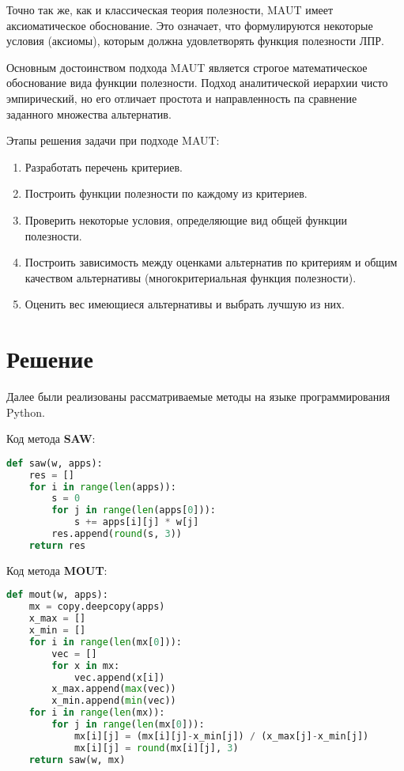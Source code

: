 Точно так же, как и классическая теория полезности, MAUT имеет
аксиоматическое обоснование. Это означает, что формулируются
некоторые условия (аксиомы), которым должна удовлетворять функция
полезности ЛПР.\par
Основным достоинством подхода MAUT является строгое математическое
обоснование вида функции полезности. Подход аналитической иерархии чисто
эмпирический, но его отличает простота и направленность па сравнение
заданного множества альтернатив.

Этапы решения задачи при подходе MAUT:
\begin{enumerate}
	\item Разработать перечень критериев.
	\item Построить функции полезности по каждому из критериев.
	\item Проверить некоторые условия, определяющие вид общей
		функции полезности.
	\item Построить зависимость между оценками альтернатив
		по критериям и общим качеством альтернативы
		(многокритериальная функция полезности).
	\item Оценить вес имеющиеся альтернативы и выбрать лучшую из них.
\end{enumerate}

\section{Решение}
Далее были реализованы рассматриваемые методы на языке программирования
Python.

Код метода \textbf{SAW}:
\begin{lstlisting}[language=Python]
def saw(w, apps):
	res = []
	for i in range(len(apps)):
		s = 0
		for j in range(len(apps[0])):
			s += apps[i][j] * w[j]
		res.append(round(s, 3))
	return res
\end{lstlisting}

Код метода \textbf{MOUT}:
\begin{lstlisting}[language=Python]
def mout(w, apps):
	mx = copy.deepcopy(apps)
	x_max = []
	x_min = []
	for i in range(len(mx[0])):
		vec = []
		for x in mx:
			vec.append(x[i])
		x_max.append(max(vec))
		x_min.append(min(vec))
	for i in range(len(mx)):
		for j in range(len(mx[0])):
			mx[i][j] = (mx[i][j]-x_min[j]) / (x_max[j]-x_min[j])
			mx[i][j] = round(mx[i][j], 3)
	return saw(w, mx)
\end{lstlisting}

